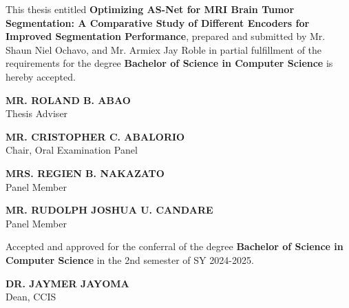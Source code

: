 \begin{approvalPage}

This thesis entitled \textbf{Optimizing AS-Net for MRI Brain Tumor Segmentation: A Comparative Study of Different Encoders for Improved Segmentation Performance}, prepared and submitted by Mr. Shaun Niel Ochavo, and Mr. Armiex Jay Roble in partial fulfillment of the requirements for the degree \textbf{Bachelor of Science in Computer Science} is hereby accepted. 

\vspace{2cm} %

\centering %

\textbf{MR. ROLAND B. ABAO} \\
Thesis Adviser

\vspace{1.5cm} %

\textbf{MR. CRISTOPHER C. ABALORIO} \\
Chair, Oral Examination Panel

\vspace{1.5cm} %

\noindent %
\begin{minipage}[t]{0.45\textwidth} %
\centering
\textbf{MRS. REGIEN B. NAKAZATO} \\
Panel Member
\end{minipage}%
\hfill %
\begin{minipage}[t]{0.45\textwidth} %
\centering
\textbf{MR. RUDOLPH JOSHUA U. CANDARE} \\
Panel Member
\end{minipage}

\vspace{2cm} %

\centering
Accepted and approved for the conferral of the degree \textbf{Bachelor of Science in Computer Science} in the 2nd semester of SY 2024-2025.

\vspace{1.5cm} %

\noindent %
\hfill %
\begin{minipage}[t]{0.45\textwidth} %
\centering %
\textbf{DR. JAYMER JAYOMA} \\
Dean, CCIS
\end{minipage}

\clearpage %

\end{approvalPage}

